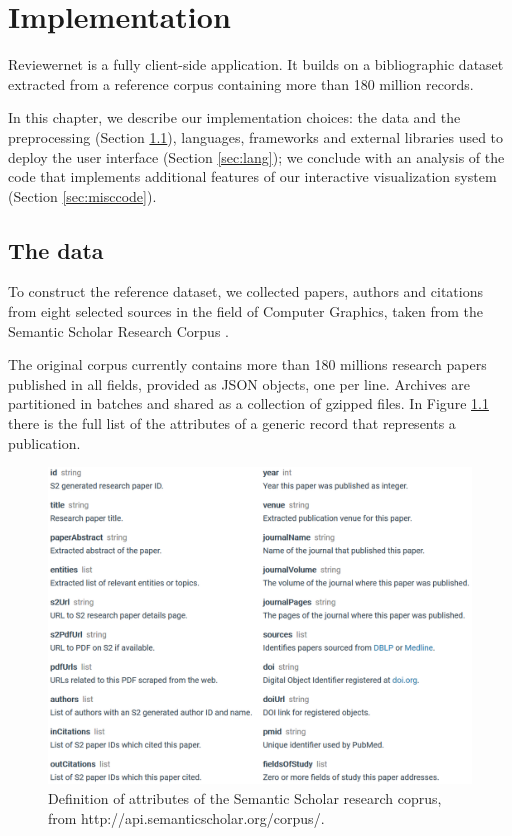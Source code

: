 \chapter{Implementation}
\label{sec:impl}
Reviewernet is a fully client-side application. It builds on a bibliographic dataset extracted from a reference corpus containing more than 180 million records.

In this chapter, we describe our implementation choices: the data and the preprocessing  (Section \ref{sec:data}), languages, frameworks and external libraries used to deploy the user interface (Section \ref{sec:lang}); we conclude with an analysis of the code that implements additional features of our interactive visualization system (Section \ref{sec:misccode}).
\section{The data}
\label{sec:data}
To construct the reference dataset, we collected papers, authors and citations from eight selected sources in the field of Computer Graphics, taken from the Semantic Scholar Research Corpus \cite{ammar:18}. 

The original corpus currently contains more than 180 millions research papers published in all fields, provided as JSON objects, one per line. Archives are partitioned in batches and shared as a collection of gzipped files. In Figure \ref{jsonfields} there is the full list of the attributes of a generic record that represents a publication.

\begin{figure}[!ht]
    \centering
    \includegraphics[width=\textwidth]{fig/corpusfields.png}
    \caption{Definition of attributes of the Semantic Scholar research coprus, from http://api.semanticscholar.org/corpus/. \label{jsonfields}}
\end{figure}

